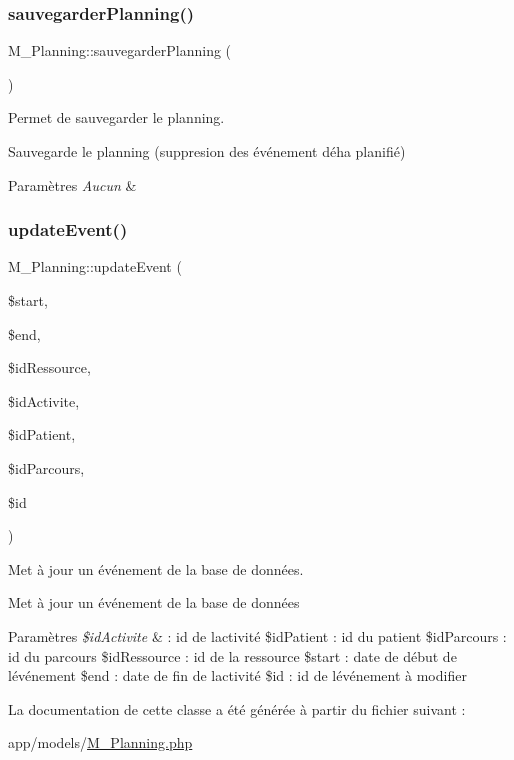 \subsubsection{\texorpdfstring{sauvegarder\+Planning()}{sauvegarderPlanning()}}
{\footnotesize\ttfamily M\+\_\+\+Planning\+::sauvegarder\+Planning (\begin{DoxyParamCaption}{ }\end{DoxyParamCaption})}



Permet de sauvegarder le planning. 

Sauvegarde le planning (suppresion des événement déha planifié) 
\begin{DoxyParams}{Paramètres}
{\em Aucun} & \\
\hline
\end{DoxyParams}
\mbox{\label{class_m___planning_ae30966fd39181041d0ed71f60b4dd4f7}} 
\subsubsection{\texorpdfstring{update\+Event()}{updateEvent()}}
{\footnotesize\ttfamily M\+\_\+\+Planning\+::update\+Event (\begin{DoxyParamCaption}\item[{}]{\$start,  }\item[{}]{\$end,  }\item[{}]{\$id\+Ressource,  }\item[{}]{\$id\+Activite,  }\item[{}]{\$id\+Patient,  }\item[{}]{\$id\+Parcours,  }\item[{}]{\$id }\end{DoxyParamCaption})}



Met à jour un événement de la base de données. 

Met à jour un événement de la base de données 
\begin{DoxyParams}{Paramètres}
{\em \$id\+Activite} & \+: id de l\textquotesingle{}activité \$id\+Patient \+: id du patient \$id\+Parcours \+: id du parcours \$id\+Ressource \+: id de la ressource \$start \+: date de début de l\textquotesingle{}événement \$end \+: date de fin de l\textquotesingle{}activité \$id \+: id de l\textquotesingle{}événement à modifier \\
\hline
\end{DoxyParams}


La documentation de cette classe a été générée à partir du fichier suivant \+:\begin{DoxyCompactItemize}
\item 
app/models/\hyperlink{_m___planning_8php}{M\+\_\+\+Planning.\+php}\end{DoxyCompactItemize}
